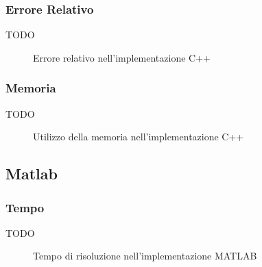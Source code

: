 \documentclass[11pt,italian]{article}
\begin{document}
\subsubsection*{Errore Relativo}
TODO
\begin{figure}[H]
    \caption{Errore relativo nell'implementazione C++}
    \label{fig:cpp-error}
\end{figure}

\subsubsection*{Memoria}
TODO
\begin{figure}[H]
    \caption{Utilizzo della memoria nell'implementazione C++}
    \label{fig:cpp-memory}
\end{figure}

\subsection{Matlab}
\subsubsection*{Tempo}
TODO
\begin{figure}[H]
    \caption{Tempo di risoluzione nell'implementazione MATLAB}
    \label{fig:matlab-time}
\end{figure}
\end{document}
